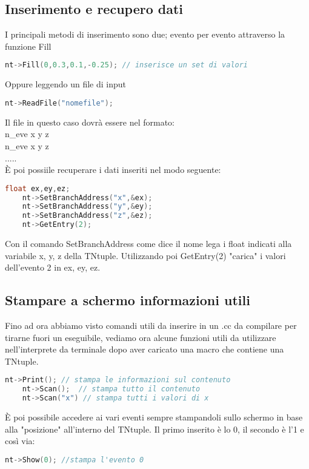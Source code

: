 \subsection{Inserimento e recupero dati}
I principali metodi di inserimento sono due; evento per evento attraverso la funzione Fill
\begin{lstlisting}[language=C++,label={cod1},mathescape=true,breaklines=true]
	nt->Fill(0,0.3,0.1,-0.25); // inserisce un set di valori
\end{lstlisting}
Oppure leggendo un file di input
\begin{lstlisting}[language=C++,label={cod1},mathescape=true,breaklines=true]
	nt->ReadFile("nomefile");
\end{lstlisting}
Il file in questo caso dovrà essere nel formato:\\
n\_eve x y z\\
n\_eve x y z\\
.....\\
È poi possiile recuperare i dati inseriti nel modo seguente:
\begin{lstlisting}[language=C++,label={cod1},mathescape=true,breaklines=true]
	float ex,ey,ez;
	nt->SetBranchAddress("x",&ex);
	nt->SetBranchAddress("y",&ey);
	nt->SetBranchAddress("z",&ez);
	nt->GetEntry(2);
\end{lstlisting}
Con il comando SetBranchAddress come dice il nome lega i float indicati alla variabile x, y, z della TNtuple. Utilizzando poi GetEntry(2) "carica" i valori dell'evento 2 in ex, ey, ez. 

\subsection{Stampare a schermo informazioni utili}
Fino ad ora abbiamo visto comandi utili da inserire in un .cc da compilare per tirarne fuori un eseguibile,  vediamo ora alcune funzioni utili da utilizzare nell'interprete da terminale dopo aver caricato una macro che contiene una TNtuple.
\begin{lstlisting}[language=C++,label={cod1},mathescape=true,breaklines=true]
	nt->Print(); // stampa le informazioni sul contenuto
	nt->Scan();  // stampa tutto il contenuto
	nt->Scan("x") // stampa tutti i valori di x
\end{lstlisting}
È poi possibile accedere ai vari eventi sempre stampandoli sullo schermo in base alla "posizione" all'interno del TNtuple. Il primo inserito è lo 0, il secondo è l'1 e così via:
\begin{lstlisting}[language=C++,label={cod1},mathescape=true,breaklines=true]
	nt->Show(0); //stampa l'evento 0
\end{lstlisting}

